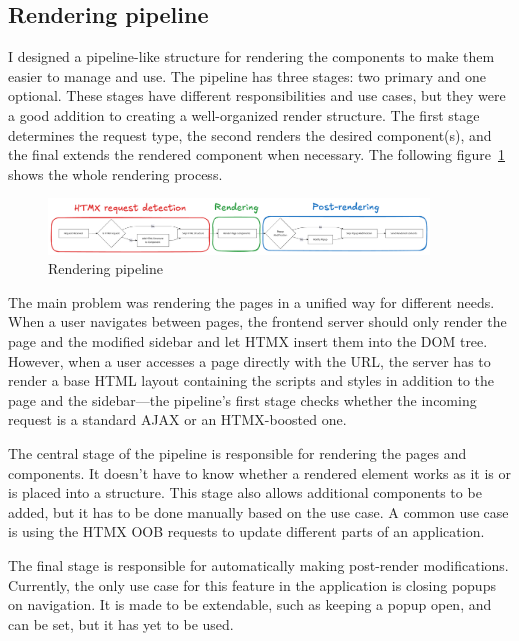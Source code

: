 \subsection{Rendering pipeline}

I designed a pipeline-like structure for rendering the components to make them easier to manage and use. The pipeline has three stages: two primary and one optional. These stages have different responsibilities and use cases, but they were a good addition to creating a well-organized render structure. The first stage determines the request type, the second renders the desired component(s), and the final extends the rendered component when necessary. The following figure~\ref{fig:rendering-pipeline} shows the whole rendering process.

\begin{figure}[H]
    \centering
    \includegraphics[width=0.9\textwidth, keepaspectratio]{figures/rendering-pipeline.png}
    \caption{Rendering pipeline}
    \label{fig:rendering-pipeline}
\end{figure}

The main problem was rendering the pages in a unified way for different needs. When a user navigates between pages, the frontend server should only render the page and the modified sidebar and let HTMX insert them into the DOM tree. However, when a user accesses a page directly with the URL, the server has to render a base HTML layout containing the scripts and styles in addition to the page and the sidebar—the pipeline's first stage checks whether the incoming request is a standard AJAX or an HTMX-boosted one.

The central stage of the pipeline is responsible for rendering the pages and components. It doesn't have to know whether a rendered element works as it is or is placed into a structure. This stage also allows additional components to be added, but it has to be done manually based on the use case. A common use case is using the HTMX OOB requests to update different parts of an application.

The final stage is responsible for automatically making post-render modifications. Currently, the only use case for this feature in the application is closing popups on navigation. It is made to be extendable, such as keeping a popup open, and can be set, but it has yet to be used.

